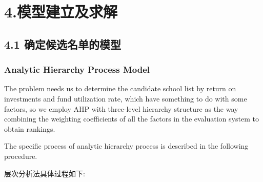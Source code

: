 \documentclass{mcmthesis}
\begin{document}
\section{4.模型建立及求解}
\subsection{4.1 确定候选名单的模型}
\subsubsection{Analytic Hierarchy Process Model}
The problem needs us to determine the candidate school list by return on investments and fund utilization rate, which have something to do with some factors, so we employ AHP with three-level hierarchy structure as the way combining the weighting coefficients of all the factors in the evaluation system to obtain rankings.\par
The specific process of analytic hierarchy process is described in the following procedure.\par
层次分析法具体过程如下:
\end{document}
